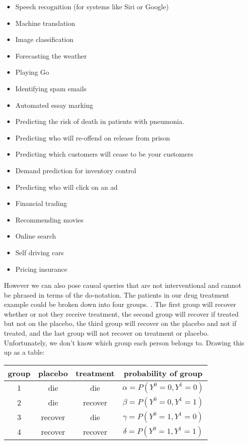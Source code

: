 \begin{itemize}
\item Speech recognition (for systems like Siri or Google)
\item Machine translation 
\item Image classification
\item Forecasting the weather
\item Playing Go 
\item Identifying spam emails
\item Automated essay marking
\item Predicting the risk of death in patients with pneumonia.
\item Predicting who will re-offend on release from prison 
\item Predicting which customers will cease to be your customers
\item Demand prediction for inventory control
\item Predicting who will click on an ad
\item Financial trading
\item Recommending movies
\item Online search
\item Self driving cars
\item Pricing insurance
\end{itemize}



However we can also pose causal queries that are not interventional and cannot be phrased in terms of the do-notation. The patients in our drug treatment example could be broken down into four groups. . The first group will recover whether or not they receive treatment, the second group will recover if treated but not on the placebo, the third group will recover on the placebo and not if treated, and the last group will not recover on treatment or placebo. Unfortunately, we don't know which group each person belongs to. Drawing this up as a table:

\begin{tabular}{c|c|c|c}
group & placebo & treatment & probability of group\\
\hline
1 & die & die & $\alpha=P(Y^{0}=0,Y^{1}=0)$\\
2 & die & recover & $\beta=P(Y^{0}=0,Y^{1}=1)$\\
3 & recover & die & $\gamma=P(Y^{0}=1,Y^{1}=0)$\\
4 & recover & recover & $\delta=P(Y^{0}=1,Y^{1}=1)$\\
\end{tabular}

